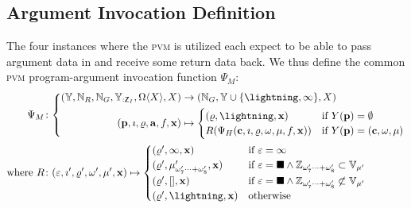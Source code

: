 \subsection{Argument Invocation Definition}

The four instances where the \textsc{pvm} is utilized each expect to be able to pass argument data in and receive some return data back. We thus define the common \textsc{pvm} program-argument invocation function $\Psi_M$:
\begin{align}
  \Psi_M&\colon \left\{\begin{aligned}
    (\Y, \N_R, \N_G, \Y_{:\mathsf{Z}_I}, \Omega\langle X \rangle, X) &\to (\N_G, \Y \cup \{\panic, \oog\}, X)\\
    (\mathbf{p}, \imath, \gascounter, \mathbf{a}, f, \mathbf{x}) &\mapsto \begin{cases}
      (\gascounter, \panic, \mathbf{x}) &\when Y(\mathbf{p}) = \none\\
      R(\Psi_H(\mathbf{c}, \imath, \gascounter, \registers, \mem, f, \mathbf{x})) &\when Y(\mathbf{p}) = (\mathbf{c}, \registers, \mem)
    \end{cases}
  \end{aligned}\right.\\
  \where R&\colon (\varepsilon, \imath', \gascounter', \registers', \mem', \mathbf{x}) \mapsto \begin{cases}
    (\gascounter', \oog, \mathbf{x}) &\when \varepsilon = \oog \\
    (\gascounter', \memory'_{\registers'_{7}\dots+\registers'_{8}}, \mathbf{x}) &\when \varepsilon = \halt \wedge \mathbb{Z}_{\registers'_{7}\dots+\registers'_{8}} \subset \mathbb{V}_{\mem'} \\
    (\gascounter', [], \mathbf{x}) &\when \varepsilon = \halt \wedge \mathbb{Z}_{\registers'_{7}\dots+\registers'_{8}} \not\subset \mathbb{V}_{\mem'} \\
    (\gascounter', \panic, \mathbf{x}) &\otherwise \\
  \end{cases}
\end{align}
